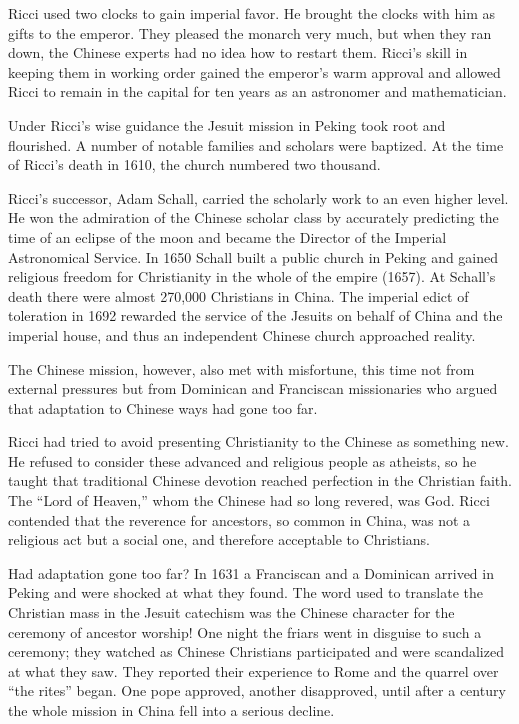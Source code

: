 Ricci used two clocks to gain imperial favor. He brought the clocks with him as gifts to the
emperor. They pleased the monarch very much, but when they ran down, the Chinese experts had no idea
how to restart them. Ricci’s skill in keeping them in working order gained the emperor’s warm
approval and allowed Ricci to remain in the capital for ten years as an astronomer and
mathematician.

Under Ricci’s wise guidance the Jesuit mission in Peking took root and flourished. A number of
notable families and scholars were baptized. At the time of Ricci’s death in 1610, the church
numbered two thousand.

Ricci’s successor, Adam Schall, carried the scholarly work to an even higher level. He won the
admiration of the Chinese scholar class by accurately predicting the time of an eclipse of the moon
and became the Director of the Imperial Astronomical Service. In 1650 Schall built a public church
in Peking and gained religious freedom for Christianity in the whole of the empire (1657). At
Schall’s death there were almost 270,000 Christians in China. The imperial edict of toleration in
1692 rewarded the service of the Jesuits on behalf of China and the imperial house, and thus an
independent Chinese church approached reality.

The Chinese mission, however, also met with misfortune, this time not from external pressures but
from Dominican and Franciscan missionaries who argued that adaptation to Chinese ways had gone too
far.

Ricci had tried to avoid presenting Christianity to the Chinese as something new. He refused to
consider these advanced and religious people as atheists, so he taught that traditional Chinese
devotion reached perfection in the Christian faith. The “Lord of Heaven,” whom the Chinese had so
long revered, was God. Ricci contended that the reverence for ancestors, so common in China, was not
a religious act but a social one, and therefore acceptable to Christians.

Had adaptation gone too far? In 1631 a Franciscan and a Dominican arrived in Peking and were shocked
at what they found. The word used to translate the Christian mass in the Jesuit catechism was the
Chinese character for the ceremony of ancestor worship! One night the friars went in disguise to
such a ceremony; they watched as Chinese Christians participated and were scandalized at what they
saw. They reported their experience to Rome and the quarrel over “the rites” began. One pope
approved, another disapproved, until after a century the whole mission in China fell into a serious
decline.

